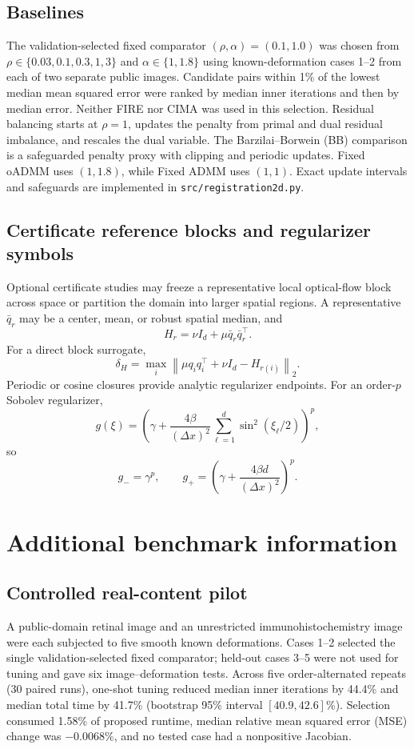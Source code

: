 \documentclass[11pt]{article}
\newcommand{\norm}[1]{\left\lVert #1\right\rVert}
\begin{document}
\subsection{Baselines}
The validation-selected fixed comparator $(\rho,\alpha)=(0.1, 1.0)$ was chosen
from $\rho\in\{0.03,0.1,0.3,1,3\}$ and $\alpha\in\{1,1.8\}$ using
known-deformation cases 1--2 from each of two separate public images. Candidate
pairs within 1\% of the lowest median mean squared error were ranked by median
inner iterations and then by median error. Neither FIRE nor CIMA was used in
this selection. Residual balancing starts at $\rho=1$, updates the penalty from
primal and dual residual imbalance, and rescales the dual variable. The
Barzilai--Borwein (BB) comparison is a safeguarded penalty proxy with clipping
and periodic updates. Fixed oADMM uses $(1, 1.8)$, while Fixed ADMM uses
$(1, 1)$. Exact update intervals and safeguards are implemented in
\texttt{src/registration2d.py}.

\subsection{Certificate reference blocks and regularizer symbols}
Optional certificate studies may freeze a representative local optical-flow
block across space or partition the domain into larger spatial regions. A
representative $\bar q_r$ may be a center, mean, or robust spatial median, and
\[
H_r=\nu I_d+\mu\bar q_r\bar q_r^\top.
\]
For a direct block surrogate,
\[
\delta_H=\max_i
\norm{\mu q_iq_i^\top+\nu I_d-H_{r(i)}}_2.
\]
Periodic or cosine closures provide analytic regularizer endpoints. For an
order-$p$ Sobolev regularizer,
\[
g(\xi)=
\left(
\gamma+\frac{4\beta}{(\Delta x)^2}
\sum_{\ell=1}^d\sin^2(\xi_\ell/2)
\right)^p,
\]
so
\[
g_-=\gamma^p,\qquad
g_+=\left(\gamma+\frac{4\beta d}{(\Delta x)^2}\right)^p.
\]

\section{Additional benchmark information}\label{sec:benchmark}
\subsection{Controlled real-content pilot}
A public-domain retinal image and an unrestricted immunohistochemistry image
were each subjected to five smooth known deformations. Cases 1--2 selected the
single validation-selected fixed comparator; held-out cases 3--5 were not used
for tuning and gave six image--deformation tests. Across five order-alternated repeats (30
paired runs), one-shot tuning reduced median inner
iterations by 44.4\% and median total time by 41.7\% (bootstrap 95\% interval
$[40.9,42.6]$\%). Selection consumed 1.58\% of proposed runtime, median
relative mean squared error (MSE) change was $-0.0068$\%, and no tested case had a nonpositive
Jacobian.
\end{document}
